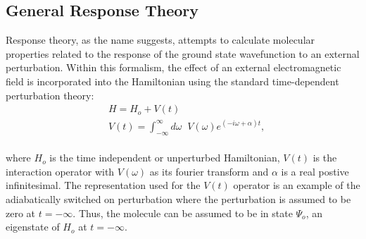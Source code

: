 \subsection{General Response Theory}
Response theory, as the name suggests, attempts to calculate molecular properties related 
to the response of the ground state wavefunction to an external perturbation. Within this 
formalism, the effect of an external electromagnetic field is incorporated into the 
Hamiltonian using the standard time-dependent perturbation theory:
\\
\begin{equation}
\begin{split}
& H = H_o + V(t)\\
&V(t) = \int_{-\infty}^{\infty}d\omega\;\;V(\omega) e^{(-i\omega + \alpha)t},
\end{split}
\end{equation}
\\
where $H_o$ is the time independent or unperturbed Hamiltonian, $V(t)$ is the interaction 
operator with $V(\omega)$ as its fourier transform and $\alpha$ is a real postive infinitesimal.
The representation used for the $V(t)$ operator is an example of the adiabatically 
switched on perturbation\cite{Koch90} where the perturbation is assumed to be zero at 
$t = -\infty$. Thus, the molecule can be assumed to be in state $\Psi_o$, an 
eigenstate of $H_o$ at $t = -\infty$.
